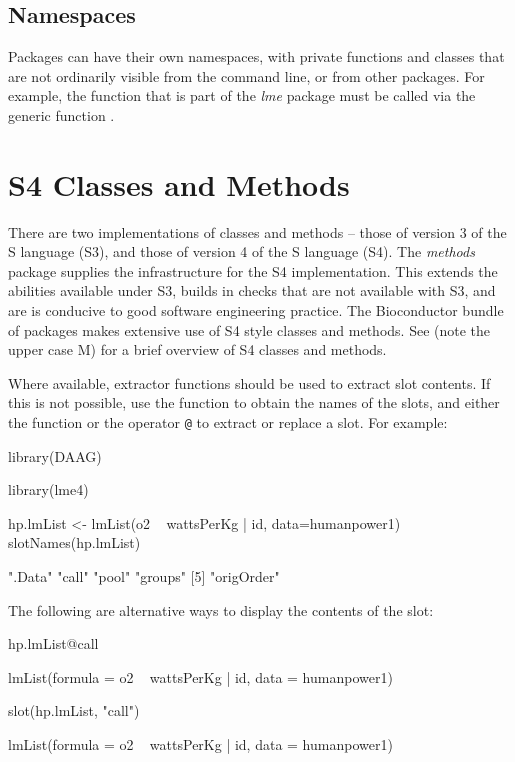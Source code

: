 \subsection*{Namespaces}
Packages can have their own namespaces, with private functions and
classes that are not ordinarily visible from the command line, or from
other packages.  For example, the function 
that is part of the \textit{lme} package must be called via the generic
function .

\section{S4 Classes and Methods}\label{sec:s4}
There are two implementations of classes and methods -- those of
version 3 of the S language (S3), and those of version 4 of the S
language (S4).  The \textit{methods} package supplies the
infrastructure for the S4 implementation. This extends the abilities
available under S3, builds in checks that are not available with S3,
and are is conducive to good software engineering practice.  The
Bioconductor bundle of packages makes extensive use of S4 style
classes and methods. See  (note the upper case M)
for a brief overview of S4 classes and methods.

Where available, extractor functions should be used to extract slot
contents. If this is not possible, use the function
 to obtain the names of the slots, and either the
function  or the operator \verb!@! to extract or
replace a slot.  For example:
\begin{Schunk}
\begin{Sinput}
library(DAAG)
\end{Sinput}
\begin{Sinput}
library(lme4)
\end{Sinput}
\begin{Sinput}
hp.lmList <- lmList(o2 ~ wattsPerKg | id,
                    data=humanpower1)
slotNames(hp.lmList)
\end{Sinput}
\begin{Soutput}
[1] ".Data"     "call"      "pool"      "groups"   
[5] "origOrder"
\end{Soutput}
\end{Schunk}

The following are alternative ways to display the contents of the
 slot:
\begin{fullwidth}
\begin{Schunk}
\begin{Sinput}
hp.lmList@call
\end{Sinput}
\begin{Soutput}
lmList(formula = o2 ~ wattsPerKg | id, data = humanpower1)
\end{Soutput}
\begin{Sinput}
slot(hp.lmList, "call")
\end{Sinput}
\begin{Soutput}
lmList(formula = o2 ~ wattsPerKg | id, data = humanpower1)
\end{Soutput}
\end{Schunk}
\end{fullwidth}


